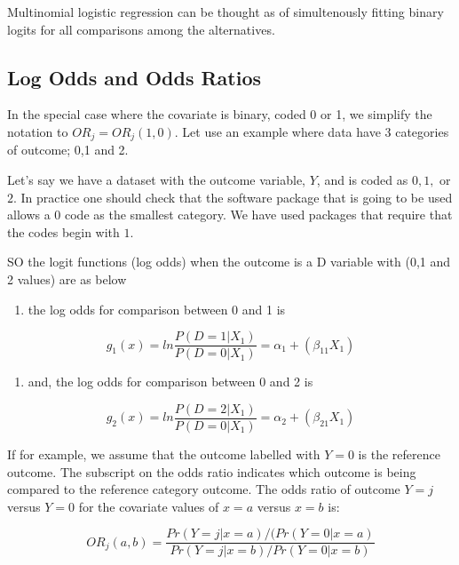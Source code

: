 \documentclass[
  10pt,
]{krantz}
\providecommand{\tightlist}{%
  \setlength{\itemsep}{0pt}\setlength{\parskip}{0pt}}
\begin{document}
Multinomial logistic regression can be thought as of simultenously fitting binary logits for all comparisons among the alternatives.

\hypertarget{log-odds-and-odds-ratios}{%
\subsection{\texorpdfstring{Log Odds and Odds Ratios}{Log Odds and Odds Ratios}}\label{log-odds-and-odds-ratios}}

In the special case where the covariate is binary, coded 0 or 1, we simplify the notation to \(OR_j = OR_j(1,0)\). Let use an example where data have 3 categories of outcome; 0,1 and 2.

Let's say we have a dataset with the outcome variable, \(Y\), and is coded as \(0, 1,\) or \(2\). In practice one should check that the software package that is going to be used allows a \(0\) code as the smallest category. We have used packages that require that the codes begin with \(1\).

SO the logit functions (log odds) when the outcome is a D variable with (0,1 and 2 values) are as below

\begin{enumerate}
\def\labelenumi{\arabic{enumi}.}
\tightlist
\item
  the log odds for comparison between 0 and 1 is
\end{enumerate}

\[g_1(x) = ln\frac{P(D=1|X_1)} {P(D=0|X_1)}=\alpha_1 + (\beta_{11}X_1)\]

\begin{enumerate}
\def\labelenumi{\arabic{enumi}.}
\setcounter{enumi}{1}
\tightlist
\item
  and, the log odds for comparison between 0 and 2 is
\end{enumerate}

\[g_2(x) =  ln\frac{P(D=2|X_1)} {P(D=0|X_1)}=\alpha_2 + (\beta_{21}X_1)\]

If for example, we assume that the outcome labelled with \(Y=0\) is the reference outcome. The subscript on the odds ratio indicates which outcome is being compared to the reference category outcome. The odds ratio of outcome \(Y = j\) versus \(Y = 0\) for the covariate values of \(x = a\) versus \(x = b\) is:

\[OR_{j}(a,b)= \frac{Pr(Y=j|x=a)/(Pr(Y=0|x=a)} {Pr(Y=j|x=b)/Pr(Y=0|x=b)}\]
\end{document}
